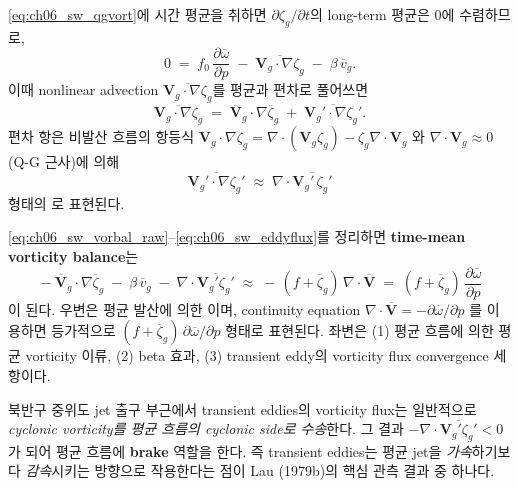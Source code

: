 \eqref{eq:ch06_sw_qgvort}에 시간 평균을 취하면 $\partial \zeta_g/\partial t$의 long-term 평균은 0에 수렴하므로,
\begin{equation}\label{eq:ch06_sw_vorbal_raw}
  0 \;=\; f_0\,\frac{\partial \overline{\omega}}{\partial p}
       \;-\; \overline{\mathbf{V}_g\!\cdot\!\nabla \zeta_g}
       \;-\; \beta\, \overline{v}_g .
\end{equation}
이때 nonlinear advection $\overline{\mathbf{V}_g\!\cdot\!\nabla\zeta_g}$를 평균과 편차로 풀어쓰면
\begin{equation}\label{eq:ch06_sw_advdecomp}
  \overline{\mathbf{V}_g\!\cdot\!\nabla\zeta_g}
  \;=\; \overline{\mathbf{V}}_g\!\cdot\!\nabla \overline{\zeta}_g
       \;+\; \overline{\mathbf{V}_g'\!\cdot\!\nabla \zeta_g'} .
\end{equation}
편차 항은 비발산 흐름의 항등식 $\mathbf{V}_g\!\cdot\!\nabla\zeta_g = \nabla\!\cdot\!(\mathbf{V}_g\zeta_g) - \zeta_g\nabla\!\cdot\!\mathbf{V}_g$
와 $\nabla\!\cdot\!\mathbf{V}_g \approx 0$ (Q-G 근사)에 의해
\begin{equation}\label{eq:ch06_sw_eddyflux}
  \overline{\mathbf{V}_g'\!\cdot\!\nabla \zeta_g'}
  \;\approx\; \nabla\!\cdot\!\overline{\mathbf{V}_g'\,\zeta_g'}
\end{equation}
형태의 로 표현된다.

\eqref{eq:ch06_sw_vorbal_raw}--\eqref{eq:ch06_sw_eddyflux}를 정리하면 \textbf{time-mean vorticity balance}는
\begin{equation}\label{eq:ch06_sw_vorbal_final}
  \boxed{\;
  -\overline{\mathbf{V}}_g\!\cdot\!\nabla\overline{\zeta}_g
  \;-\; \beta\,\overline{v}_g
  \;-\; \nabla\!\cdot\!\overline{\mathbf{V}_g'\zeta_g'}
  \;\approx\;
  -\,(f + \overline{\zeta}_g)\,\nabla\!\cdot\!\overline{\mathbf{V}}
  \;=\; (f + \overline{\zeta}_g)\,\frac{\partial \overline{\omega}}{\partial p}
  \;}
\end{equation}
이 된다.  우변은 평균 발산에 의한 이며,
continuity equation $\nabla\!\cdot\!\overline{\mathbf{V}} = -\partial\overline{\omega}/\partial p$
를 이용하면 등가적으로 $(f+\overline{\zeta}_g)\,\partial\overline{\omega}/\partial p$
형태로 표현된다.
좌변은 (1) 평균 흐름에 의한 평균 vorticity 이류, (2) beta 효과,
(3) transient eddy의 vorticity flux convergence 세 항이다.

\begin{remark}\label{rem:ch06_sw_brake}
북반구 중위도 jet 출구 부근에서 transient eddies의 vorticity flux는
일반적으로 \emph{cyclonic vorticity를 평균 흐름의 cyclonic side로 수송}한다.
그 결과 $-\nabla\!\cdot\!\overline{\mathbf{V}_g'\zeta_g'} < 0$가 되어
평균 흐름에 \textbf{brake} 역할을 한다.
즉 transient eddies는 평균 jet을 \emph{가속}하기보다 \emph{감속}시키는 방향으로 작용한다는 점이
Lau (1979b)의 핵심 관측 결과 중 하나다.
\end{remark}

